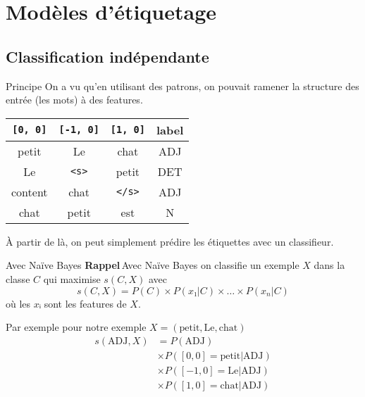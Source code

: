\documentclass[../allslides.tex]{subfiles}
\begin{document}
\section{Modèles d'étiquetage}
\subsection{Classification indépendante}
\begin{frame}[fragile]{Principe}
	On a vu qu'en utilisant des patrons, on pouvait ramener la structure des entrée (les mots) à des features.

	\begin{table}
		\begin{tabu} to .9\textwidth {cccc}
			\texttt{[0, 0]}	& \texttt{[-1, 0]}	& \texttt{[1, 0]}	& label\\
			\midrule
			petit	& Le	& chat	& ADJ\\
			Le	& \texttt{<s>}	& petit	& DET\\
			content	& chat	& \texttt{</s>}	& ADJ\\
			chat	& petit	& est	& N
		\end{tabu}
	\end{table}

	À partir de là, on peut simplement prédire les étiquettes avec un classifieur.
\end{frame}

\begin{frame}{Avec Naïve Bayes}
	\textbf{Rappel} Avec Naïve Bayes on classifie un exemple $X$ dans la classe $C$ qui maximise $s(C,X)$ avec
	\begin{equation}
		s(C,X) = P(C) × P(x₁|C) × … × P(x_n|C)
	\end{equation}
	où les $xᵢ$ sont les features de $X$.

	Par exemple pour notre exemple $X = (\text{petit}, \text{Le}, \text{chat})$
	\begin{equation}
		\begin{split}
			s(\text{ADJ}, X)
				&= P(\text{ADJ})\\
				&× P([0,0]=\text{petit}|\text{ADJ})\\
				&× P([-1,0]=\text{Le}|\text{ADJ})\\
				&× P([1,0]=\text{chat}|\text{ADJ})
		\end{split}
	\end{equation}
\end{frame}
\end{document}
